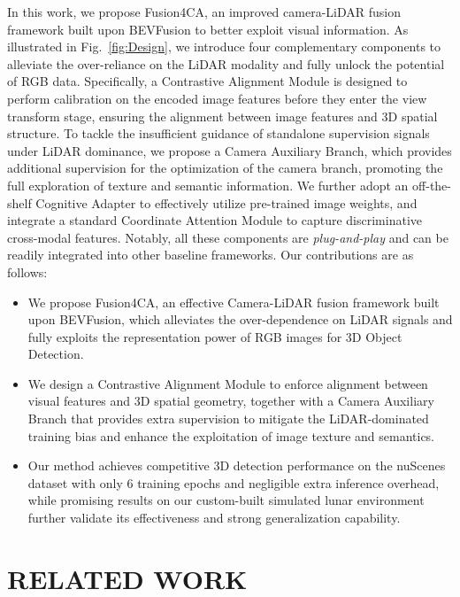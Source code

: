 \documentclass[letterpaper, 10 pt, conference]{ieeeconf}  %
\begin{document}
 In this work, we propose Fusion4CA, an improved camera-LiDAR fusion framework built upon BEVFusion \cite{liu2023bevfusion} to better exploit visual information. As illustrated in Fig.~\ref{fig:Design}, we introduce four complementary components to alleviate the over-reliance on the LiDAR modality and fully unlock the potential of RGB data. Specifically, a Contrastive Alignment Module is designed to perform calibration on the encoded image features before they enter the view transform stage, ensuring the alignment between image features and 3D spatial structure. To tackle the insufficient guidance of standalone supervision signals under LiDAR dominance, we propose a Camera Auxiliary Branch, which provides additional supervision for the optimization of the camera branch, promoting the full exploration of texture and semantic information. We further adopt an off-the-shelf Cognitive Adapter \cite{yin20255} to effectively utilize pre-trained image weights, and integrate a standard Coordinate Attention Module \cite{hou2021coordinate} to capture discriminative cross-modal features. Notably, all these components are \textit{plug-and-play} and can be readily integrated into other baseline frameworks. Our contributions are as follows:

\begin{itemize}
\item We propose Fusion4CA, an effective Camera-LiDAR fusion framework built upon BEVFusion, which alleviates the over-dependence on LiDAR signals and fully exploits the representation power of RGB images for 3D Object Detection.
\item We design a Contrastive Alignment Module to enforce alignment between visual features and 3D spatial geometry, together with a Camera Auxiliary Branch that provides extra supervision to mitigate the LiDAR-dominated training bias and enhance the exploitation of image texture and semantics.
\item Our method achieves competitive 3D detection performance on the nuScenes dataset with only 6 training epochs and negligible extra inference overhead, while promising results on our custom-built simulated lunar environment further validate its effectiveness and strong generalization capability.
\end{itemize}

\section{RELATED WORK}
\end{document}

